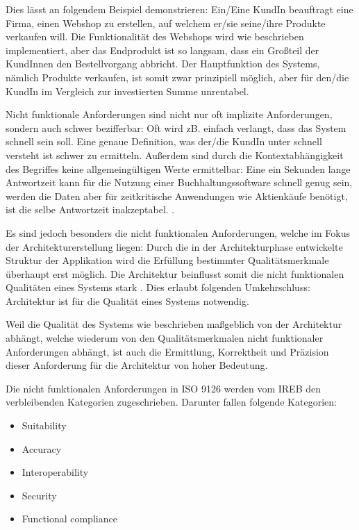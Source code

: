 Dies lässt an folgendem Beispiel demonstrieren: Ein/Eine KundIn beauftragt eine Firma, einen Webshop zu erstellen, auf welchem er/sie seine/ihre Produkte verkaufen will. Die Funktionalität des Webshops wird wie beschrieben implementiert, aber das Endprodukt ist so langsam, dass ein Großteil der KundInnen den Bestellvorgang abbricht. Der Hauptfunktion des Systems, nämlich Produkte verkaufen, ist somit zwar prinzipiell möglich, aber für den/die KundIn im Vergleich zur investierten Summe unrentabel.

Nicht funktionale Anforderungen sind nicht nur oft implizite Anforderungen, sondern auch schwer bezifferbar: Oft wird zB. einfach verlangt, dass das System schnell sein soll. Eine genaue Definition, was der/die KundIn unter schnell versteht ist schwer zu ermitteln. Außerdem sind durch die Kontextabhängigkeit des Begriffes keine allgemeingültigen Werte ermittelbar: Eine ein Sekunden lange Antwortzeit kann für die Nutzung einer Buchhaltungssoftware schnell genug sein, werden die Daten aber für zeitkritische Anwendungen wie Aktienkäufe benötigt, ist die selbe Antwortzeit inakzeptabel. \cite[S. 59]{effektiv}.

Es sind jedoch besonders die nicht funktionalen Anforderungen, welche im Fokus der Architekturerstellung liegen: Durch die in der Architekturphase entwickelte Struktur der Applikation wird die Erfüllung bestimmter Qualitätsmerkmale überhaupt erst möglich. Die Architektur beinflusst somit die nicht funktionalen Qualitäten eines Systems stark \cite[S. 109]{softarch}. Dies erlaubt folgenden Umkehrschluss: \glqq Architektur ist für die Qualität eines Systems notwendig\grqq \cite[S. 59]{effektiv}. \cite[S. 19]{effektiv}

Weil die Qualität des Systems wie beschrieben maßgeblich von der Architektur abhängt, welche wiederum von den Qualitätsmerkmalen nicht funktionaler Anforderungen abhängt, ist auch die Ermittlung, Korrektheit und Präzision dieser Anforderung für die Architektur von hoher Bedeutung.

Die nicht funktionalen Anforderungen in ISO 9126 werden vom IREB den  verbleibenden Kategorien zugeschrieben. Darunter fallen folgende Kategorien\cite[S. 9]{ireb}:

\begin{itemize}
  \item \glqq Suitability\grqq
  \item \glqq Accuracy\grqq
  \item \glqq Interoperability\grqq
  \item \glqq Security\grqq
  \item \glqq Functional compliance\grqq
\end{itemize}

